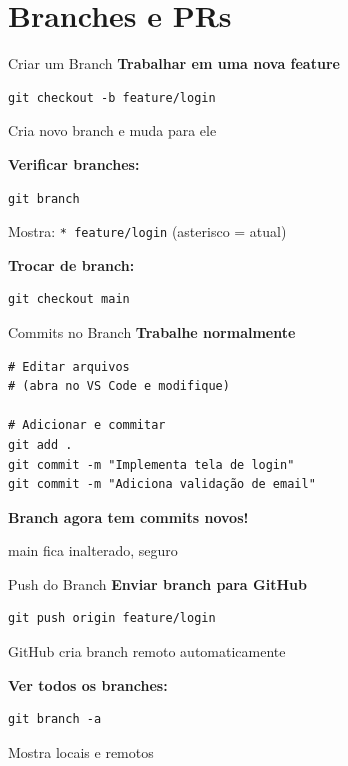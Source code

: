 \documentclass[11pt]{beamer}
\begin{document}
\section{Branches e PRs}

\begin{frame}{Criar um Branch}
\textbf{Trabalhar em uma nova feature}

\begin{lstlisting}
git checkout -b feature/login
\end{lstlisting}

Cria novo branch e muda para ele

\vspace{0.5cm}

\textbf{Verificar branches:}
\begin{lstlisting}
git branch
\end{lstlisting}

Mostra: \texttt{* feature/login} (asterisco = atual)

\vspace{0.5cm}

\textbf{Trocar de branch:}
\begin{lstlisting}
git checkout main
\end{lstlisting}
\end{frame}

\begin{frame}{Commits no Branch}
\textbf{Trabalhe normalmente}

\begin{lstlisting}
# Editar arquivos
# (abra no VS Code e modifique)

# Adicionar e commitar
git add .
git commit -m "Implementa tela de login"
git commit -m "Adiciona validação de email"
\end{lstlisting}

\vspace{0.5cm}

\textbf{Branch agora tem commits novos!}

main fica inalterado, seguro
\end{frame}

\begin{frame}{Push do Branch}
\textbf{Enviar branch para GitHub}

\begin{lstlisting}
git push origin feature/login
\end{lstlisting}

GitHub cria branch remoto automaticamente

\vspace{0.5cm}

\textbf{Ver todos os branches:}
\begin{lstlisting}
git branch -a
\end{lstlisting}

Mostra locais e remotos
\end{frame}
\end{document}
